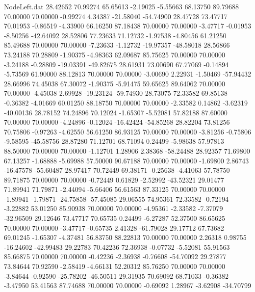 \begin{filecontents}{NodeLeft.dat}
  28.42652   70.99274   65.65613    -2.19025   -5.55663   68.13750   89.79688   70.00000   70.00000   -0.99274    4.34387  -21.58040  -54.74900
  28.47728   73.47717   70.01953    -0.86519   -4.33900   66.16250   87.18438   70.00000   70.00000   -3.47717   -0.01953   -8.50256  -42.64092
  28.52806   77.23633   71.12732    -1.97538   -4.80456   61.21250   85.49688   70.00000   70.00000   -7.23633   -1.12732  -19.97357  -48.58018
  28.56866   73.24188   70.28809    -1.90375   -4.98363   62.09687   85.75625   70.00000   70.00000   -3.24188   -0.28809  -19.03391  -49.82675
  28.61931   73.00690   67.77069    -0.14894   -5.73569   61.90000   88.12813   70.00000   70.00000   -3.00690    2.22931   -1.50469  -57.94432
  28.66996   74.45038   67.30072    -1.90375   -5.91475   59.65625   89.64062   70.00000   70.00000   -4.45038    2.69928  -19.23124  -59.74930
  28.73075   72.33582   69.85138    -0.36382   -4.01669   60.01250   88.18750   70.00000   70.00000   -2.33582    0.14862   -3.62319  -40.00136
  28.78152   74.24896   70.12024    -1.65307   -5.52081   57.82188   87.60000   70.00000   70.00000   -4.24896   -0.12024  -16.42424  -54.85268
  28.82204   73.81256   70.75806    -0.97263   -4.62550   56.61250   86.93125   70.00000   70.00000   -3.81256   -0.75806   -9.58595  -45.58756
  28.87280   71.12701   68.71094     0.24499   -5.98638   57.97813   88.50000   70.00000   70.00000   -1.12701    1.28906    2.38368  -58.24488
  28.92357   71.69800   67.13257    -1.68888   -5.69988   57.50000   90.67188   70.00000   70.00000   -1.69800    2.86743  -16.47578  -55.60487
  28.97417   70.72449   69.38171    -0.25638   -4.41063   57.78750   89.71875   70.00000   70.00000   -0.72449    0.61829   -2.52992  -43.52321
  29.01477   71.89941   71.79871    -2.44094   -5.66406   56.61563   87.33125   70.00000   70.00000   -1.89941   -1.79871  -24.75858  -57.45085
  29.06555   74.95361   72.33582    -0.72194   -3.22882   53.01250   85.90938   70.00000   70.00000   -4.95361   -2.33582   -7.37079  -32.96509
  29.12646   73.47717   70.65735     0.24499   -6.27287   52.37500   86.65625   70.00000   70.00000   -3.47717   -0.65735    2.41328  -61.79028
  29.17712   67.73682   69.01245    -1.65307   -4.37481   56.83750   88.22813   70.00000   70.00000    2.26318    0.98755  -16.24602  -42.99483
  29.22783   70.42236   72.36938    -0.07732   -5.52081   55.91563   85.66875   70.00000   70.00000   -0.42236   -2.36938   -0.76608  -54.70092
  29.27877   73.84644   70.92590    -2.58419   -4.66131   52.20312   85.76250   70.00000   70.00000   -3.84644   -0.92590  -25.78202  -46.50511
  29.31935   70.69092   68.71033    -0.36382   -3.47950   53.41563   87.74688   70.00000   70.00000   -0.69092    1.28967   -3.62908  -34.70799

\end{filecontents}

